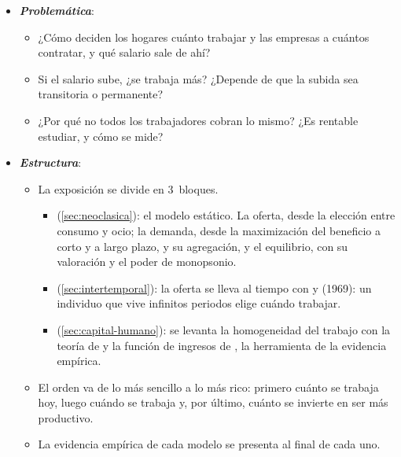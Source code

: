 \documentclass[11pt]{article}
\begin{document}
\begin{itemize}
\item \textbf{\emph{Problemática}}:
  \begin{itemize}
  \item ¿Cómo deciden los hogares cuánto trabajar y las empresas a cuántos contratar, y qué salario sale de ahí?
  \item Si el salario sube, ¿se trabaja más? ¿Depende de que la subida sea transitoria o permanente?
  \item ¿Por qué no todos los trabajadores cobran lo mismo? ¿Es rentable estudiar, y cómo se mide?
  \end{itemize}

\item \textbf{\emph{Estructura}}:
  \begin{itemize}
  \item La exposición se divide en 3~bloques.
  \begin{itemize}
  \item {} (\ref{sec:neoclasica}): el modelo estático. La oferta, desde la elección entre consumo y ocio; la demanda, desde la maximización del beneficio a corto y a largo plazo, y su agregación, y el equilibrio, con su valoración y el poder de monopsonio.
  \item {} (\ref{sec:intertemporal}): la oferta se lleva al tiempo con  y  (1969): un individuo que vive infinitos periodos elige cuándo trabajar.
  \item {} (\ref{sec:capital-humano}): se levanta la homogeneidad del trabajo con la teoría de  y la función de ingresos de , la herramienta de la evidencia empírica.
  \end{itemize}
  \item El orden va de lo más sencillo a lo más rico: primero cuánto se trabaja hoy, luego cuándo se trabaja y, por último, cuánto se invierte en ser más productivo.
  \item La evidencia empírica de cada modelo se presenta al final de cada uno.
  \end{itemize}
\end{itemize}
\end{document}
